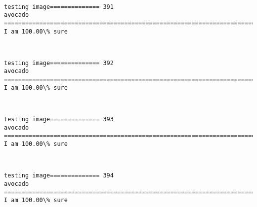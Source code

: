 \documentclass[11pt]{article}
\begin{document}
    \begin{center}
    \end{center}
    { \hspace*{\fill} \\}
    
    \begin{Verbatim}[commandchars=\\\{\}]
testing image============== 391
avocado
============================================================================
I am 100.00\% sure

    \end{Verbatim}

    \begin{center}
    \end{center}
    { \hspace*{\fill} \\}
    
    \begin{Verbatim}[commandchars=\\\{\}]
testing image============== 392
avocado
============================================================================
I am 100.00\% sure

    \end{Verbatim}

    \begin{center}
    \end{center}
    { \hspace*{\fill} \\}
    
    \begin{Verbatim}[commandchars=\\\{\}]
testing image============== 393
avocado
============================================================================
I am 100.00\% sure

    \end{Verbatim}

    \begin{center}
    \end{center}
    { \hspace*{\fill} \\}
    
    \begin{Verbatim}[commandchars=\\\{\}]
testing image============== 394
avocado
============================================================================
I am 100.00\% sure

    \end{Verbatim}
\end{document}
